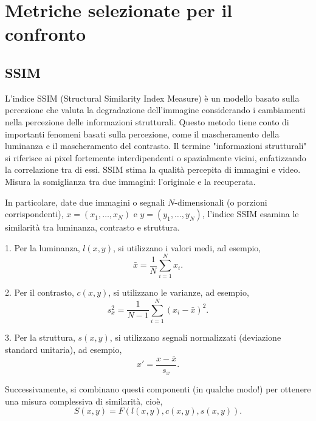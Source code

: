 \section{Metriche selezionate per il confronto}

\subsection{SSIM}
L'indice SSIM (Structural Similarity Index Measure) è un modello basato sulla percezione che valuta la degradazione dell'immagine considerando i cambiamenti nella percezione delle informazioni strutturali. Questo metodo tiene conto di importanti fenomeni basati sulla percezione, come il mascheramento della luminanza e il mascheramento del contrasto. Il termine "informazioni strutturali" si riferisce ai pixel fortemente interdipendenti o spazialmente vicini, enfatizzando la correlazione tra di essi.
SSIM stima la qualità percepita di immagini e video. Misura la somiglianza tra due immagini: l'originale e la recuperata\cite{sara2019image}.

In particolare, date due immagini o segnali $N$-dimensionali (o porzioni corrispondenti), $x = (x_1, \ldots, x_N)$ e $y = (y_1, \ldots, y_N)$, l'indice SSIM esamina le similarità tra luminanza, contrasto e struttura.

1. Per la luminanza, $l(x, y)$, si utilizzano i valori medi, ad esempio,
\[
\bar{x} = \frac{1}{N} \sum_{i=1}^{N} x_i.
\]

2. Per il contrasto, $c(x, y)$, si utilizzano le varianze, ad esempio,
\[
s_x^2 = \frac{1}{N-1} \sum_{i=1}^{N} (x_i - \bar{x})^2.
\]

3. Per la struttura, $s(x, y)$, si utilizzano segnali normalizzati (deviazione standard unitaria), ad esempio,
\[
x' = \frac{x - \bar{x}}{s_x}.
\]

Successivamente, si combinano questi componenti (in qualche modo!) per ottenere una misura complessiva di similarità, cioè,
\[
S(x, y) = F(l(x, y), c(x, y), s(x, y)).
\]

